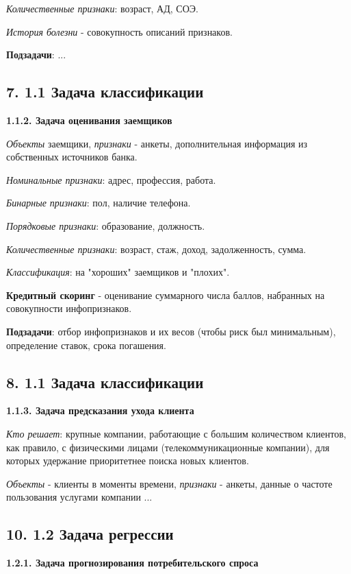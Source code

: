 \textit{Количественные признаки}: возраст, АД, СОЭ.

\textit{История болезни} - совокупность описаний признаков.

\textbf{Подзадачи}: ...

\subsection{7. 1.1 Задача классификации}

\textbf{1.1.2. Задача оценивания заемщиков}

\textit{Объекты} заемщики, \textit{признаки} - анкеты, дополнительная информация из
собственных источников банка.

\textit{Номинальные признаки}: адрес, профессия, работа.

\textit{Бинарные признаки}: пол, наличие телефона.

\textit{Порядковые признаки}: образование, должность.

\textit{Количественные признаки}: возраст, стаж, доход, задолженность, сумма.

\textit{Классификация}: на "хороших" заемщиков и "плохих".

\textbf{Кредитный скоринг} - оценивание суммарного числа баллов, набранных на
совокупности инфопризнаков.

\textbf{Подзадачи}: отбор инфопризнаков и их весов (чтобы риск был минимальным),
определение ставок, срока погашения.

\subsection{8. 1.1 Задача классификации}

\textbf{1.1.3. Задача предсказания ухода клиента}

\textit{Кто решает}: крупные компании, работающие с большим количеством клиентов,
как правило, с физическими лицами (телекоммуникационные компании), для
которых удержание приоритетнее поиска новых клиентов.

\textit{Объекты} - клиенты в моменты времени, \textit{признаки} - анкеты, данные о
частоте пользования услугами компании ...

\subsection{10. 1.2 Задача регрессии}

\textbf{1.2.1. Задача прогнозирования потребительского спроса}


